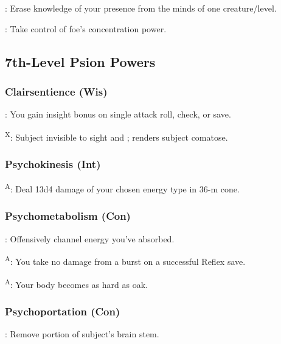 : Erase knowledge of your presence from the minds of one creature/level.

: Take control of foe's concentration power.




\subsection{7th-Level Psion Powers}


\subsubsection{Clairsentience (Wis)}

: You gain insight bonus on single attack roll, check, or save.

\textsuperscript{X}: Subject invisible to sight and ; renders subject comatose.




\subsubsection{Psychokinesis (Int)}

\textsuperscript{A}: Deal 13d4 damage of your chosen energy type in 36-m cone.


\subsubsection{Psychometabolism (Con)}

: Offensively channel energy you've absorbed.

\textsuperscript{A}: You take no damage from a burst on a successful Reflex save.

\textsuperscript{A}: Your body becomes as hard as oak.


\subsubsection{Psychoportation (Con)}

: Remove portion of subject's brain stem.

